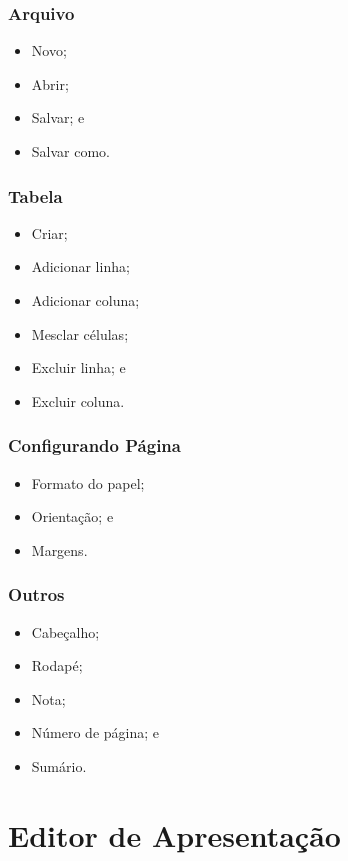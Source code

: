 \documentclass[aspectratio=169]{beamer} %
\begin{document}
\begin{frame}
	\frametitle{Arquivo}
			
	\begin{itemize}
		\item Novo;
		\item Abrir;
		\item Salvar; e
		\item Salvar como.
	\end{itemize}
\end{frame}

\begin{frame}
	\frametitle{Tabela}
			
	\begin{itemize}
		\item Criar;
		\item Adicionar linha; 
		\item Adicionar coluna; 
		\item Mesclar células; 
		\item Excluir linha; e 
		\item Excluir coluna.
	\end{itemize}
\end{frame}

\begin{frame}
	\frametitle{Configurando Página}
			
	\begin{itemize}
		\item Formato do papel; 
		\item Orientação; e 
		\item Margens.
	\end{itemize}
\end{frame}

\begin{frame}
	\frametitle{Outros}
			
	\begin{itemize}
		\item Cabeçalho;
		\item Rodapé;
		\item Nota;
		\item Número de página; e
		\item Sumário.
	\end{itemize}
\end{frame}

\section{Editor de Apresenta\c cão}
\end{document}
